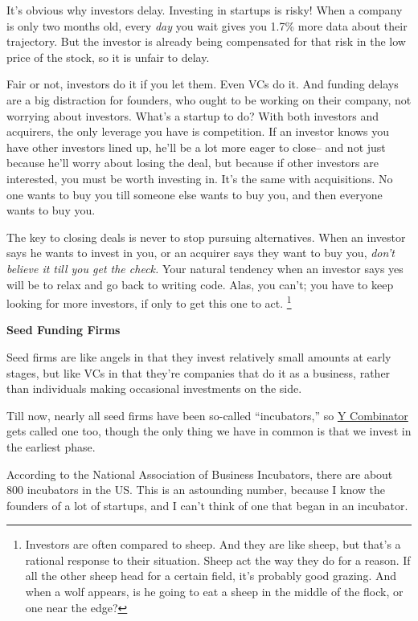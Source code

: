 \documentclass[12pt]{book}
\begin{document}
It's obvious why investors delay. Investing in startups is risky! When a
company is only two months old, every \emph{day} you wait gives you
1.7\% more data about their trajectory. But the investor is already
being compensated for that risk in the low price of the stock, so it is
unfair to delay.

Fair or not, investors do it if you let them. Even VCs do it. And
funding delays are a big distraction for founders, who ought to be
working on their company, not worrying about investors. What's a startup
to do? With both investors and acquirers, the only leverage you have is
competition. If an investor knows you have other investors lined up,
he'll be a lot more eager to close-- and not just because he'll worry
about losing the deal, but because if other investors are interested,
you must be worth investing in. It's the same with acquisitions. No one
wants to buy you till someone else wants to buy you, and then everyone
wants to buy you.

The key to closing deals is never to stop pursuing alternatives. When an
investor says he wants to invest in you, or an acquirer says they want
to buy you, \emph{don't believe it till you get the check.} Your natural
tendency when an investor says yes will be to relax and go back to
writing code. Alas, you can't; you have to keep looking for more
investors, if only to get this one to act. \footnote{Investors are often compared to sheep. And they are like sheep,
but that's a rational response to their situation. Sheep act the way
they do for a reason. If all the other sheep head for a certain field,
it's probably good grazing. And when a wolf appears, is he going to eat
a sheep in the middle of the flock, or one near the edge?}

\textbf{Seed Funding Firms}

Seed firms are like angels in that they invest relatively small amounts
at early stages, but like VCs in that they're companies that do it as a
business, rather than individuals making occasional investments on the
side.

Till now, nearly all seed firms have been so-called ``incubators,'' so
\href{http://ycombinator.com}{Y Combinator} gets called one too, though
the only thing we have in common is that we invest in the earliest
phase.

According to the National Association of Business Incubators, there are
about 800 incubators in the US. This is an astounding number, because I
know the founders of a lot of startups, and I can't think of one that
began in an incubator.
\end{document}
